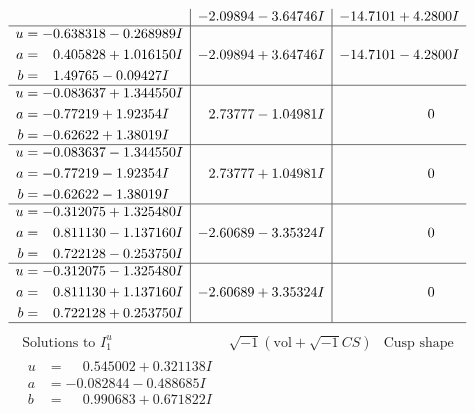 \documentclass[1p]{elsarticle_modified}
\theoremstyle{definition}
\newcommand{\I}{\sqrt{-1}}
\begin{document}
$$\begin{array}{c|c|c}
 & -2.09894 - 3.64746 I & -14.7101 + 4.2800 I \\ \hline\begin{aligned}
u &= -0.638318 - 0.268989 I \\
a &= \phantom{-}0.405828 + 1.016150 I \\
b &= \phantom{-}1.49765 - 0.09427 I\end{aligned}
 & -2.09894 + 3.64746 I & -14.7101 - 4.2800 I \\ \hline\begin{aligned}
u &= -0.083637 + 1.344550 I \\
a &= -0.77219 + 1.92354 I \\
b &= -0.62622 + 1.38019 I\end{aligned}
 & \phantom{-}2.73777 - 1.04981 I & \phantom{-0.000000 } 0 \\ \hline\begin{aligned}
u &= -0.083637 - 1.344550 I \\
a &= -0.77219 - 1.92354 I \\
b &= -0.62622 - 1.38019 I\end{aligned}
 & \phantom{-}2.73777 + 1.04981 I & \phantom{-0.000000 } 0 \\ \hline\begin{aligned}
u &= -0.312075 + 1.325480 I \\
a &= \phantom{-}0.811130 - 1.137160 I \\
b &= \phantom{-}0.722128 - 0.253750 I\end{aligned}
 & -2.60689 - 3.35324 I & \phantom{-0.000000 } 0 \\ \hline\begin{aligned}
u &= -0.312075 - 1.325480 I \\
a &= \phantom{-}0.811130 + 1.137160 I \\
b &= \phantom{-}0.722128 + 0.253750 I\end{aligned}
 & -2.60689 + 3.35324 I & \phantom{-0.000000 } 0\\
 \hline 
 \end{array}$$\newpage$$\begin{array}{c|c|c}  
\text{Solutions to }I^u_{1}& \I (\text{vol} + \sqrt{-1}CS) & \text{Cusp shape}\\
 \hline 
\begin{aligned}
u &= \phantom{-}0.545002 + 0.321138 I \\
a &= -0.082844 - 0.488685 I \\
b &= \phantom{-}0.990683 + 0.671822 I\end{aligned}

\end{array}$$
\end{document}
